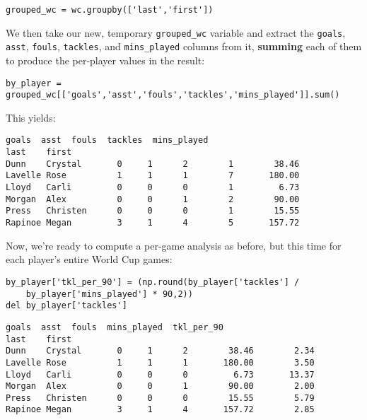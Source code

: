 \begin{Verbatim}[fontsize=\footnotesize,samepage=true,frame=single,framesep=3mm]
grouped_wc = wc.groupby(['last','first'])
\end{Verbatim}

We then take our new, temporary \texttt{grouped\_wc} variable and extract the
\texttt{goals}, \texttt{asst}, \texttt{fouls}, \texttt{tackles}, and
\texttt{mins\_played} columns from it, \textbf{summing} each of them to produce
the per-player values in the result:


\begin{Verbatim}[fontsize=\footnotesize,samepage=true,frame=single,framesep=3mm]
by_player = grouped_wc[['goals','asst','fouls','tackles','mins_played']].sum()
\end{Verbatim}

This yields:

\begin{Verbatim}[fontsize=\small,samepage=true,frame=leftline,framesep=5mm,framerule=1mm]
                  goals  asst  fouls  tackles  mins_played
last    first                                             
Dunn    Crystal       0     1      2        1        38.46
Lavelle Rose          1     1      1        7       180.00
Lloyd   Carli         0     0      0        1         6.73
Morgan  Alex          0     0      1        2        90.00
Press   Christen      0     0      0        1        15.55
Rapinoe Megan         3     1      4        5       157.72
\end{Verbatim}

Now, we're ready to compute a per-game analysis as before, but this time for
each player's entire World Cup games:

\begin{Verbatim}[fontsize=\small,samepage=true,frame=single,framesep=3mm]
by_player['tkl_per_90'] = (np.round(by_player['tackles'] /
    by_player['mins_played'] * 90,2))
del by_player['tackles']
\end{Verbatim}
\vspace{-.2in}

\begin{Verbatim}[fontsize=\small,samepage=true,frame=leftline,framesep=5mm,framerule=1mm]
                  goals  asst  fouls  mins_played  tkl_per_90
last    first                                                
Dunn    Crystal       0     1      2        38.46        2.34
Lavelle Rose          1     1      1       180.00        3.50
Lloyd   Carli         0     0      0         6.73       13.37
Morgan  Alex          0     0      1        90.00        2.00
Press   Christen      0     0      0        15.55        5.79
Rapinoe Megan         3     1      4       157.72        2.85
\end{Verbatim}


